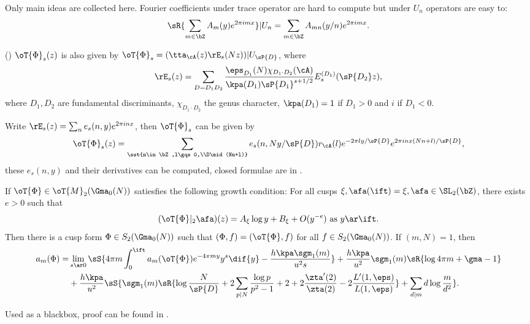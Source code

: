 \documentclass[article, a4paper, twoside]{universal}
\begin{document}
\begin{prf}
	Only main ideas are collected here. Fourier coefficients under trace operator are hard to compute but under $U_{n}$ operators are easy to:
	\[
		\sR{\sum_{m\in\bZ}A_{m}(y)e^{2\pi imx}}|U_{n}=\sum_{m\in\bZ}A_{mn}(y/n)e^{2\pi imx}.
	\]


	(\cite[IV.2.4]{GZ1986}) $\oT{\Phi}_{s}(z)$ is also given by $\oT{\Phi}_{s}=(\tta_{\cA}(z)\rE_{s}(Nz))|U_{\sP{D}}$, where
	\[
		\rE_{s}(z)=\sum_{D=D_{1}D_{2}}\frac{\eps_{D_{1}}(N)\chi_{D_{1}\cdot D_{2}}(\cA)}{\kpa(D_{1})\sP{D_{1}}^{s+1/2}}E_{s}^{(D_{1})}(\sP{D_{2}}z),
	\]
	where $D_{1},D_{2}$ are fundamental discriminants, $\chi_{D_{1}\cdot D_{2}}$ the genus character, $\kpa(D_{1})=1$ if $D_{1}>0$ and $i$ if $D_{1}<0$.

	Write $\rE_{s}(z)=\sum_{n}e_{s}(n,y)e^{2\pi inx}$, then $\oT{\Phi}_{s}$ can be given by
	\[
		\oT{\Phi}_{s}(z)=\sum_{\sst{n\in\bZ,l\gqs0,\\D\mid(Nn+l)}}e_{s}(n,Ny/\sP{D})r_{\cA}(l)e^{-2\pi ly/\sP{D}}e^{2\pi inx (Nn+l)/\sP{D}},
	\]
	these $e_{s}(n,y)$ and their derivatives can be computed, closed formulae are in \cite[IV.3.2, IV.3.3]{GZ1986}.
\end{prf}

\begin{thm}[{\cite[IV.6.2, IV.6.7, IV.6.8]{GZ1986}}]\label{thm:Sturm}
	If $\oT{\Phi}\in\oT{M}_{2}(\Gma_{0}(N))$ satiesfies the following growth condition: For all cusps $\xi, \afa(\ift)=\xi, \afa\in\SL_{2}(\bZ)$, there exists $e>0$ such that
	\[
		(\oT{\Phi}|_{2}\afa)(z)=A_{\xi}\log y+B_{\xi}+O(y^{-e})\text{ as $y\ar\ift$}.
	\]
	Then there is a cusp form $\Phi\in S_{2}(\Gma_{0}(N))$ such that $(\Phi,f)=(\oT{\Phi},f)$ for all $f\in S_{2}(\Gma_{0}(N))$. If $(m,N)=1$, then
	\begin{align*}
	  a_{m}(\Phi)=&\lim_{s\ar 0}\sS{4\pi m\int_{0}^{\ift}a_{m}(\oT{\Phi})e^{-4\pi my}y^{s}\dif{y}-\frac{h\kpa\sgm_{1}(m)}{u^{2}s}}+\frac{h\kpa}{u^{2}}\sgm_{1}(m)\sR{\log{4\pi m}+\gma-1}\\
			   &+\frac{h\kpa}{u^{2}}\sS{\sgm_{1}(m)\sR{\log\frac{N}{\sP{D}}+2\sum_{p\mid N}\frac{\log p}{p^{2}-1}+2+2\frac{\zta'(2)}{\zta(2)}-2\frac{L'(1,\eps)}{L(1,\eps)}}+\sum_{d\mid m}d\log\frac{m}{d^{2}}}. \\
	\end{align*}
\end{thm}

\begin{rmk}
	Used as a blackbox, proof can be found in \cite[Page~296-300]{GZ1986}.
\end{rmk}
\end{document}
